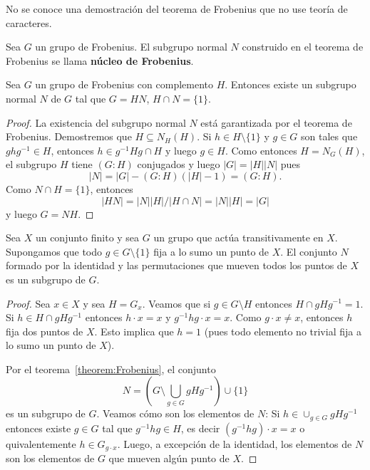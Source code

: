 No se conoce una demostración del teorema de Frobenius que no use teoría de caracteres. 

\begin{definition}
  Sea $G$ un grupo de Frobenius. El subgrupo normal
  $N$ construido en el teorema de Frobenius se llama \textbf{núcleo de
  Frobenius}.
\end{definition}

\begin{corollary}
  Sea $G$ un grupo de Frobenius con complemento $H$. 
  Entonces existe un subgrupo normal $N$ de $G$ tal que
  $G=HN$, $H\cap N=\{1\}$.
\end{corollary}

\begin{proof}
  La existencia del subgrupo normal $N$ está garantizada por el
  teorema de Frobenius. Demostremos que $H\subseteq N_H(H)$. Si $h\in
  H\setminus\{1\}$ y $g\in G$ son tales que $ghg^{-1}\in H$, entonces $h\in
  g^{-1}Hg\cap H$ y luego $g\in H$. Como entonces $H=N_G(H)$, el subgrupo $H$
  tiene $(G:H)$ conjugados y luego $|G|=|H||N|$ pues 
  \[
    |N|=|G|-(G:H)(|H|-1)=(G:H).
  \]
  Como $N\cap H=\{1\}$, entonces 
  \[
  |HN|=|N||H|/|H\cap N|=|N||H|=|G|
  \]
  y luego $G=NH$.
\end{proof}

\begin{corollary}
    \label{cor:Frobenius_combinatorio}
    Sea $X$ un conjunto finito y sea $G$ un grupo que actúa transitivamente en
    $X$. Supongamos que todo $g\in G\setminus\{1\}$ fija a lo sumo un punto de
     $X$. El conjunto $N$ formado por la identidad y las permutaciones que mueven
     todos los puntos de $X$ es un subgrupo de $G$.
\end{corollary}

\begin{proof}
  Sea $x\in X$ y sea $H=G_x$. Veamos que si $g\in G\setminus H$ entonces $H\cap
  gHg^{-1}=1$. Si $h\in H\cap gHg^{-1}$ entonces $h\cdot x=x$ y $g^{-1}hg\cdot
  x=x$. Como $g\cdot x\ne x$, entonces $h$ fija dos puntos de $X$. Esto implica
  que $h=1$ (pues todo elemento no trivial fija a lo sumo un punto de $X$). 

  Por el teorema~\ref{theorem:Frobenius}, el conjunto
  \[
    N=\left(G\setminus\bigcup_{g\in G}gHg^{-1}\right)\cup\{1\}
  \]
  es un subgrupo de $G$. Veamos cómo son los elementos de $N$: Si
  $h\in\cup_{g\in G}gHg^{-1}$ entonces existe $g\in G$ tal que $g^{-1}hg\in H$,
  es decir $(g^{-1}hg)\cdot x=x$ o quivalentemente $h\in G_{g\cdot x}$. Luego,
  a excepción de la identidad, los elementos de $N$ son los elementos de $G$
  que mueven algún punto de $X$.
\end{proof}

